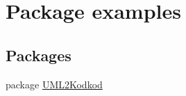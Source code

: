 \hypertarget{namespaceexamples}{\section{Package examples}
\label{namespaceexamples}
}
\subsection*{Packages}
\begin{DoxyCompactItemize}
\item 
package \hyperlink{namespaceexamples_1_1_u_m_l2_kodkod}{U\-M\-L2\-Kodkod}
\end{DoxyCompactItemize}
